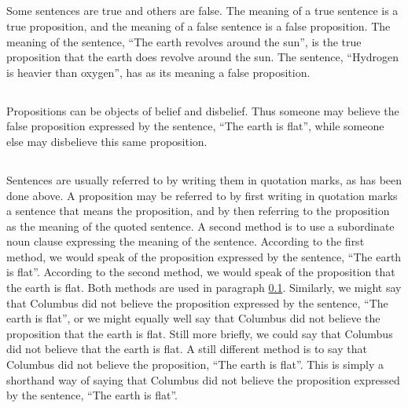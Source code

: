 \documentclass{book}
\begin{document}
\subsection{}
\label{sec:2.4}

Some sentences are true and others are false.  The meaning of a true sentence is a true proposition, and the meaning of a false sentence is a false proposition.  The meaning of the sentence, “The earth revolves around the sun”, is the true proposition that the earth does revolve around the sun.  The sentence, “Hydrogen is heavier than oxygen”, has as its meaning a false proposition.

\subsection{}
\label{sec:2.5}

Propositions can be objects of belief and disbelief.  Thus someone may believe the false proposition expressed by the sentence, “The earth is flat”, while someone else may disbelieve this same proposition.

\subsection{}
\label{sec:2.6}

Sentences are usually referred to by writing them in quotation marks, as has been done above.  A proposition may be referred to by first writing in quotation marks a sentence that means the proposition, and by then referring to the proposition as the meaning of the quoted sentence.  A second method is to use a subordinate noun clause expressing the meaning of the sentence.  According to the first method, we would speak of the proposition expressed by the sentence, “The earth is flat”.  According to the second method, we would speak of the proposition that the earth is flat.  Both methods are used in paragraph \ref{sec:2.4}.  Similarly, we might say that Columbus did not believe the proposition expressed by the sentence, “The earth is flat”, or we might equally well say that Columbus did not believe the proposition that the earth is flat.  Still more briefly, we could say that Columbus did not believe that the earth is flat.  A still different method is to say that Columbus did not believe the proposition, “The earth is flat”.  This is simply a shorthand way of saying that Columbus did not believe the proposition expressed by the sentence, “The earth is flat”.

\subsection{}
\label{sec:2.7}
\end{document}
